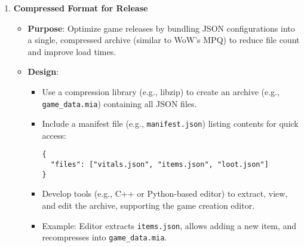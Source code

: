 \begin{enumerate}
    \item \textbf{Compressed Format for Release}
        \begin{itemize}
            \item \textbf{Purpose}: Optimize game releases by bundling JSON configurations into a single, compressed archive (similar to WoW’s MPQ) to reduce file count and improve load times.
            \item \textbf{Design}:
                \begin{itemize}
                    \item Use a compression library (e.g., libzip) to create an archive (e.g., \texttt{game\_data.mia}) containing all JSON files.
                    \item Include a manifest file (e.g., \texttt{manifest.json}) listing contents for quick access:
                    \begin{lstlisting}[style=htmlstyle]
{
  "files": ["vitals.json", "items.json", "loot.json"]
}
                    \end{lstlisting}
                    \item Develop tools (e.g., C++ or Python-based editor) to extract, view, and edit the archive, supporting the game creation editor.
                    \item Example: Editor extracts \texttt{items.json}, allows adding a new item, and recompresses into \texttt{game\_data.mia}.
                \end{itemize}
        \end{itemize}


\end{enumerate}
